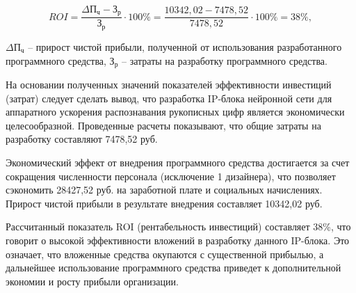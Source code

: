 \noindent
\begin{equation}
  {ROI} =  \dfrac{\Delta\text{П}_{\text{ч}} - \text{З}_{\text{р}}}{\text{З}_{\text{р}}} \cdot 100\%= \dfrac{10342,02 - 7478,52}{7478,52}\cdot 100\% = 38\%,
\end{equation}

 $\Delta\text{П}_{\text{ч}}$ – прирост чистой прибыли, полученной
от использования разработанного программного средства, $\text{З}_{\text{р}}$ –
затраты на разработку программного средства.


На основании полученных значений показателей эффективности инвестиций (затрат) 
следует сделать вывод, что разработка IP-блока нейронной сети для аппаратного 
ускорения распознавания рукописных цифр является экономически целесообразной. 
Проведенные расчеты показывают, что общие затраты на разработку составляют 
7478,52 руб.

Экономический эффект от внедрения программного средства достигается за счет 
сокращения численности персонала (исключение 1 дизайнера), что позволяет 
сэкономить 28427,52 руб. на заработной плате и социальных начислениях. 
Прирост чистой прибыли в результате внедрения составляет 10342,02 руб.

Рассчитанный показатель ROI (рентабельность инвестиций) составляет 38\%, 
что говорит о высокой эффективности вложений в разработку данного IP-блока. 
Это означает, что вложенные средства окупаются с существенной прибылью, 
а дальнейшее использование программного средства приведет к дополнительной 
экономии и росту прибыли организации.